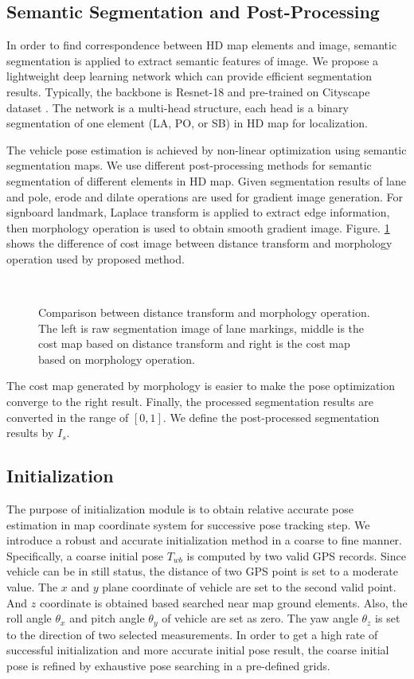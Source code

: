 \documentclass[letterpaper, 10 pt, conference]{ieeeconf}
\begin{document}
\subsection{Semantic Segmentation and Post-Processing}

In order to find correspondence between HD map elements and image, semantic segmentation is applied to extract semantic features of image. We propose a lightweight deep learning network which can provide efficient segmentation results. Typically, the backbone is Resnet-18 \cite{he2016deep} and pre-trained on Cityscape dataset \cite{cordts2016cityscapes}. The network is a multi-head structure, each head is a binary segmentation of one element (LA, PO, or SB) in HD map for localization.

The vehicle pose estimation is achieved by non-linear optimization using semantic segmentation maps. We use different post-processing methods for semantic segmentation of different elements in HD map.
Given segmentation results of lane and pole, erode and dilate operations are used for gradient image generation.
For signboard landmark, Laplace transform is applied to extract edge information, then morphology operation is used to obtain smooth gradient image. Figure. \ref{figure:dt_erode} shows the difference of cost image between distance transform and morphology operation used by proposed method. 

\begin{figure}[htb]
  \\
  \caption{Comparison between distance transform and morphology operation. The left is raw segmentation image of lane markings, middle is the cost map based on distance transform and right is the cost map based on morphology operation.} \label{figure:dt_erode}
\end{figure}

The cost map generated by morphology is easier to make the pose optimization converge to the right result. Finally, the processed segmentation results are converted in the range of $[0, 1]$. We define the post-processed segmentation results by $I_s$.


\subsection{Initialization}
The purpose of initialization module is to obtain relative accurate pose estimation in map coordinate system for successive pose tracking step. We introduce a robust and accurate initialization method in a coarse to fine manner. Specifically, a coarse initial pose $T_{wb}$ is computed by two valid GPS records. Since vehicle can be in still status, the distance of two GPS point is set to a moderate value.
The $x$ and $y$ plane coordinate of vehicle are set to the second valid point. And $z$ coordinate is obtained based searched near map ground elements. Also, the roll angle $\theta_{x}$ and pitch angle $\theta_{y}$ of vehicle are set as zero. The yaw angle $\theta_{z}$ is set to the direction of two selected measurements. In order to get a high rate of successful initialization and more accurate initial pose result, the coarse initial pose is refined by exhaustive pose searching in a pre-defined grids.
\end{document}
